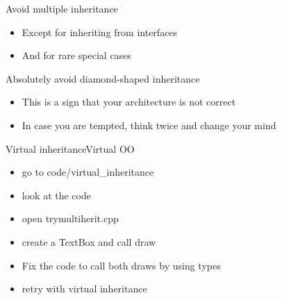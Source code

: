 \begin{frame}[fragile]
  \begin{goodpractice}{Avoid multiple inheritance}
    \begin{itemize}
    \item Except for inheriting from interfaces
    \item And for rare special cases
    \end{itemize}
  \end{goodpractice}
  \pause
  \begin{goodpractice}{Absolutely avoid diamond-shaped inheritance}
    \begin{itemize}
    \item This is a sign that your architecture is not correct
    \item In case you are tempted, think twice and change your mind
    \end{itemize}
  \end{goodpractice}
\end{frame}

\begin{frame}[fragile]
  \begin{exerciseWithShortcut}{Virtual inheritance}{Virtual OO}
    \begin{itemize}
    \item go to code/virtual\_inheritance
    \item look at the code
    \item open trymultiherit.cpp
    \item create a TextBox and call draw
    \item Fix the code to call both draws by using types
    \item retry with virtual inheritance
    \end{itemize}
  \end{exerciseWithShortcut}
\end{frame}
